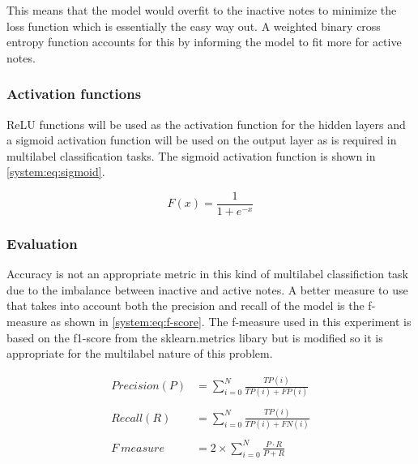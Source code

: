 This means that the model would overfit to the inactive notes to minimize the loss function which is essentially
the easy way out. A weighted binary cross entropy function accounts for this by
informing the model to fit more for active notes.

\subsubsection{Activation functions}

\ac{ReLU} functions will be used as the
activation function for the hidden layers and a sigmoid activation function will
be used on the output layer as is required in multilabel classification tasks. The sigmoid
activation function is shown in \autoref{system:eq:sigmoid}.

\begin{equation}
    F (x) = \frac{1}{1+ e^{-x}}
    \label{system:eq:sigmoid}
\end{equation}

\subsubsection{Evaluation}
Accuracy is not an appropriate metric in this kind of multilabel classifiction task due to the
imbalance between inactive and active notes. A better measure to use that takes into account both the
precision and recall of the model is the f-measure as shown in \autoref{system:eq:f-score}. The f-measure used in this experiment is based on the
f1-score from the sklearn.metrics libary but is modified so it is appropriate for the
multilabel nature of this problem.

\begin{equation}
    \begin{aligned}
        Precision(P) & = \sum_{i=0}^{N}\frac{TP(i)}{TP(i) + FP(i)}   \\ \\
        Recall(R)    & = \sum_{i=0}^{N}\frac{TP(i)}{TP(i) + FN(i)}   \\ \\
        F~measure    & = 2 \times \sum_{i=0}^{N}\frac{P\cdot R}{P+R} \\
    \end{aligned}
    \label{system:eq:f-score}
\end{equation}